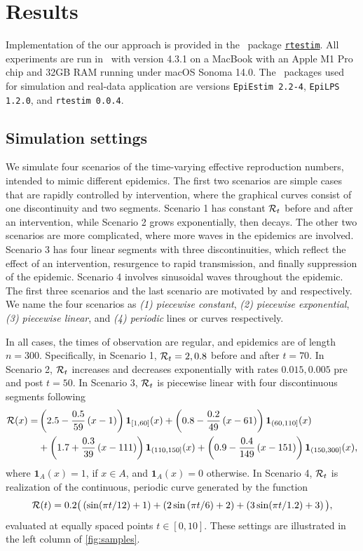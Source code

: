 \section{Results}

Implementation of the our approach is provided in the \R\ package
\href{https://dajmcdon.github.io/rtestim/}{\texttt{rtestim}}. All experiments
are run in \R\ with version 4.3.1 on a MacBook with an Apple M1 Pro chip
and 32GB RAM running under macOS Sonoma 14.0. The \R\ packages used for
simulation and real-data application are versions \texttt{EpiEstim 2.2-4},
\texttt{EpiLPS 1.2.0}, and \texttt{rtestim 0.0.4}. 

\subsection{Simulation settings}

We simulate four scenarios of the time-varying effective reproduction numbers,
intended to mimic different epidemics. The first two scenarios are simple cases
that are rapidly controlled by intervention, where the graphical curves consist
of one discontinuity and two segments. Scenario 1 has constant $\mathcal{R}_t$ before
and after an intervention, while Scenario 2 grows exponentially, then decays.
The other two scenarios are more complicated, where more waves in the epidemics
are involved. Scenario 3 has four linear segments with three discontinuities,
which reflect the effect of an intervention, resurgence to rapid transmission,
and finally suppression of the epidemic. Scenario 4 involves sinusoidal waves
throughout the epidemic.
The first three scenarios and the last scenario are motivated by
\citet{parag2021improved} and \citet{gressani2022epilps} respectively. 
We name the four scenarios as \textit{(1) piecewise constant}, \textit{(2) piecewise exponential}, 
\textit{(3) piecewise linear}, and \textit{(4) periodic} lines or curves respectively. 

In all cases, the times of observation are regular, and epidemics are of
length $n=300$. Specifically, in Scenario 1, $\mathcal{R}_t = 2, 0.8$ before and after
$t=70$. In Scenario 2, $\mathcal{R}_t$ increases and decreases exponentially with
rates $0.015, 0.005$ pre and post $t=50$. 
In Scenario 3, $\mathcal{R}_t$ is piecewise linear with four discontinuous segments following 
\begin{align*}
    \mathcal{R}(x) = & \left(2.5 - \frac{0.5}{59}\left(x-1\right)\right) \boldsymbol{1}_{[1,60]}(x)
     + \left(0.8 - \frac{0.2}{49}\left(x-61\right)\right) \boldsymbol{1}_{(60,110]}(x) \\
    & + \left(1.7 + \frac{0.3}{39}\left(x-111\right)\right) \boldsymbol{1}_{(110,150]}(x)
     + \left(0.9 - \frac{0.4}{149}\left(x-151\right)\right) \boldsymbol{1}_{(150,300]}(x),
\end{align*}
where $\boldsymbol{1}_{A}(x) = 1$, if $x\in A$, and $\boldsymbol{1}_{A}(x)=0$ otherwise. 
In Scenario 4, $\mathcal{R}_t$ is realization of the 
continuous, periodic curve generated by the function $$\mathcal{R}(t) = 0.2 \big(
\left(\sin(\pi t/12) + 1\right) + \left(2 \sin\left(\pi t / 6\right) + 2\right) + \left(3
\sin(\pi t / 1.2) + 3\right)\big),$$ evaluated at equally spaced points $t\in [0,10]$. These
settings are illustrated in the left column of \autoref{fig:samples}.


